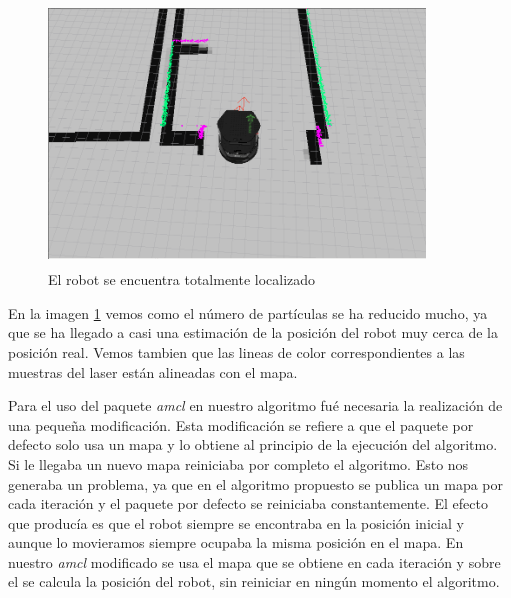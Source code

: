 \begin{figure}[hbtp]
  \begin{center}
    \includegraphics[width=10cm,height=7cm]{img/cap5/finamcl}
  \end{center}
  \caption{El robot se encuentra totalmente localizado}
  \label{fig:finamcl}
\end{figure}

En la imagen \ref{fig:finamcl} vemos como el número de partículas se ha reducido mucho, ya que se ha llegado a casi una estimación de la posición del robot muy cerca de la posición real. Vemos tambien que las lineas de color correspondientes a las muestras del laser están alineadas con el mapa.

Para el uso del paquete \textit{amcl} en nuestro algoritmo fué necesaria la realización de una pequeña modificación. Esta modificación se refiere a que el paquete por defecto solo usa un mapa y lo obtiene al principio de la ejecución del algoritmo. Si le llegaba un nuevo mapa reiniciaba por completo el algoritmo. Esto nos generaba un problema, ya que en el algoritmo propuesto se publica un mapa por cada iteración y el paquete por defecto se reiniciaba constantemente. El efecto que producía es que el robot siempre se encontraba en la posición inicial y aunque lo movieramos siempre ocupaba la misma posición en el mapa. En nuestro \textit{amcl} modificado se usa el mapa que se obtiene en cada iteración y sobre el se calcula la posición del robot, sin reiniciar en ningún momento el algoritmo.

